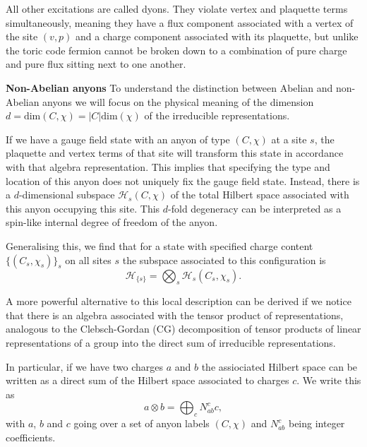 \documentclass[two column]{article}
\begin{document}
All other excitations are called dyons. They violate vertex and plaquette terms simultaneously, meaning they have a flux component associated with a vertex of the site $(v,p)$ and a charge component associated with its plaquette, but unlike the toric code fermion cannot be broken down to a combination of pure charge and pure flux sitting next to one another.

\textbf{Non-Abelian anyons} To understand the distinction between Abelian and non-Abelian anyons we will focus on the physical meaning of the dimension $d = \text{dim}(C, \chi) = |C|\text{dim}(\chi)$ of the irreducible representations.

If we have a gauge field state with an anyon of type $(C, \chi)$ at a site $s$, the plaquette and vertex terms of that site will transform this state in accordance with that algebra representation. This implies that specifying the type and location of this anyon does not uniquely fix the gauge field state. Instead, there is a $d$-dimensional subspace $\mathcal H_s(C,\chi)$ of the total Hilbert space associated with this anyon occupying this site. This $d$-fold degeneracy can be interpreted as a spin-like internal degree of freedom of the anyon.

Generalising this, we find that for a state with specified charge content $\{(C_s, \chi_s)\}_s$ on all sites $s$ the subspace associated to this configuration is
\begin{equation}
	\mathcal{H}_{\{s\}} = \bigotimes_s \mathcal H_s (C_s, \chi_s).
\end{equation}

A more powerful alternative to this local description can be derived if we notice that
there is an algebra associated with the tensor product of representations, analogous to the Clebsch-Gordan (CG) decomposition of tensor products of linear representations of a group into the direct sum of irreducible representations. 

In particular, if we have two charges $a$ and $b$ the assiociated Hilbert space can be written as a direct sum of the Hilbert space associated to charges $c$. We write this as 
\begin{equation}
	a \otimes b = \bigoplus_{c}N^c_{ab} c,\label{eqn:fuse} 
\end{equation}
with $a$, $b$ and $c$ going over a set of anyon labels $(C, \chi)$ and $N_{ab}^c$ being integer coefficients. 


\end{document}
